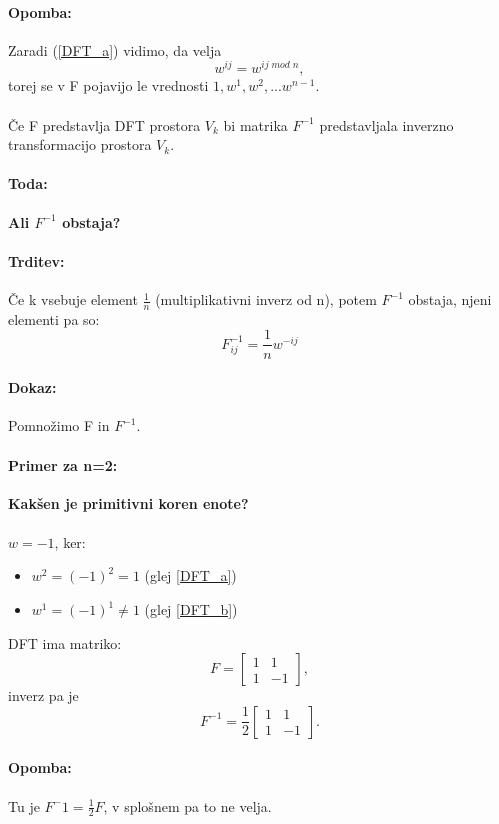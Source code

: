 \documentclass[a4paper,10pt]{article}
\begin{document}
\paragraph{Opomba:}
Zaradi (\ref{DFT_a}) vidimo, da velja 
$$w^{ij} = w^{ij\; mod\; n},$$
torej se v F pojavijo le vrednosti $1, w^1, w^2,... w^{n-1}$.\\
\\
\v Ce F predstavlja DFT prostora $V_k$ bi matrika $F^{-1}$ predstavljala inverzno transformacijo prostora $V_k$.

\paragraph{Toda:}
\textbf{Ali $F^{-1}$ obstaja?}

\paragraph{Trditev:}
\v Ce k vsebuje element $\frac{1}{n}$ (multiplikativni inverz od n), potem $F^{-1}$ obstaja, njeni elementi pa so:
$$F_{ij}^{-1} = \frac{1}{n} w^{-ij}$$

\paragraph{Dokaz:}
Pomno\v zimo F in $F^{-1}$.

\paragraph{Primer za n=2:}
\textbf{Kak\v sen je primitivni koren enote?}\\
\\
$w = -1$, ker:
\begin{itemize}
\item $w^2 = (-1)^2 = 1$ (glej \ref{DFT_a})
\item $w^1 = (-1)^1 \neq 1$ (glej \ref{DFT_b})
\end{itemize}
DFT ima matriko:
$$
F = \left [
\begin{array}{ll}
1 & 1 \\
1 & -1
\end{array}
\right ],
$$
inverz pa je 
$$
F^{-1} = \frac{1}{2} \left [
\begin{array}{ll}
1 & 1 \\
1 & -1
\end{array}
\right ].
$$

\paragraph{Opomba:}
Tu je $F^-1 = \frac{1}{2}F$, v splo\v snem pa to ne velja.
\end{document}
